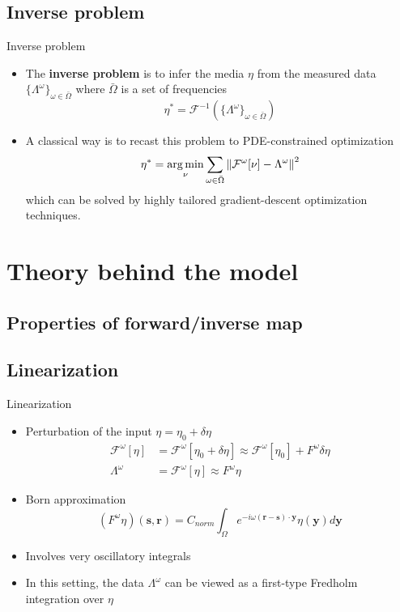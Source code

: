 \documentclass{beamer}
\DeclareMathOperator*{\argmin}{arg\,min}
\begin{document}
\subsection{Inverse problem}
\begin{frame}{Inverse problem}

\begin{itemize}
    \item The \textbf{inverse problem} is to infer the media $\eta$ from the measured data $\{\Lambda^{\omega}\}_{\omega \in \bar{\Omega}}$ where $\bar{\Omega}$ is a set of frequencies
    \begin{equation}
        \eta^* = \mathcal{F}^{-1}(\{\Lambda^{\omega}\}_{\omega \in \bar{\Omega}})
    \end{equation}
    \item A classical way is to recast this problem to PDE-constrained optimization
    \begin{equation}
        \eta^* = \argmin_{\nu}{\sum_{\omega \in \bar{\Omega}}{\norm{\mathcal{F}^\omega[\nu] - \Lambda^\omega }^2}}
    \end{equation}
    which can be solved by highly tailored gradient-descent optimization techniques.
\end{itemize}

\section{Theory behind the model}
\subsection{Properties of forward/inverse map}
\end{frame}

\subsection{Linearization}
\begin{frame}{Linearization}
    \begin{itemize}
        \item Perturbation of the input $\eta = \eta_0 + \delta \eta$ 
        \begin{align*}
            \mathcal{F}^\omega [\eta] &= \mathcal{F}^\omega [\eta_0 + \delta \eta] \approx \mathcal{F}^\omega [\eta_0] + F^\omega \delta \eta  \\
            \Lambda^\omega &= \mathcal{F}^\omega [\eta ] \approx F^\omega \eta
        \end{align*}
        \item Born approximation
        \begin{equation}
            (F^\omega\eta)(\mathbf{s}, \mathbf{r}) = C_{norm} \int_{\Omega}{e^{-i\omega (\mathbf{r} - \mathbf{s})\cdot \mathbf{y}} \eta(\mathbf{y}) d\mathbf{y}}
        \end{equation}
        \item Involves very oscillatory integrals
        \item In this setting, the data $\Lambda^\omega$ can be viewed as a first-type Fredholm integration over $\eta$
    \end{itemize}
\end{frame}
\end{document}

